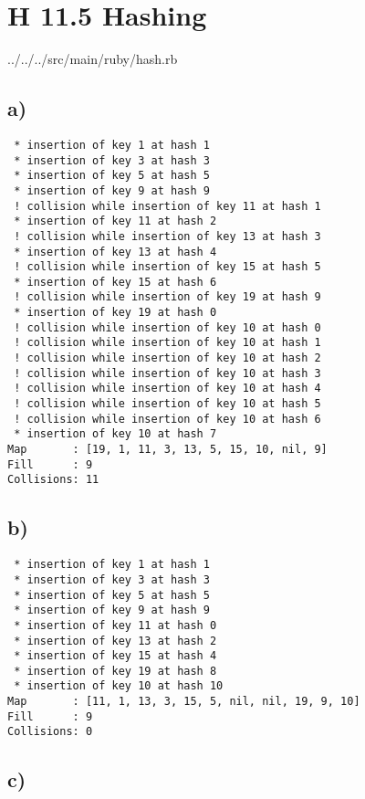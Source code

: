 \documentclass[a4paper]{article}
\begin{document}
\section*{H 11.5 Hashing}


{../../../src/main/ruby/hash.rb}

\subsection*{a)}

\begin{verbatim}
 * insertion of key 1 at hash 1
 * insertion of key 3 at hash 3
 * insertion of key 5 at hash 5
 * insertion of key 9 at hash 9
 ! collision while insertion of key 11 at hash 1
 * insertion of key 11 at hash 2
 ! collision while insertion of key 13 at hash 3
 * insertion of key 13 at hash 4
 ! collision while insertion of key 15 at hash 5
 * insertion of key 15 at hash 6
 ! collision while insertion of key 19 at hash 9
 * insertion of key 19 at hash 0
 ! collision while insertion of key 10 at hash 0
 ! collision while insertion of key 10 at hash 1
 ! collision while insertion of key 10 at hash 2
 ! collision while insertion of key 10 at hash 3
 ! collision while insertion of key 10 at hash 4
 ! collision while insertion of key 10 at hash 5
 ! collision while insertion of key 10 at hash 6
 * insertion of key 10 at hash 7
Map       : [19, 1, 11, 3, 13, 5, 15, 10, nil, 9]
Fill      : 9
Collisions: 11
\end{verbatim}

\subsection*{b)}

\begin{verbatim}
 * insertion of key 1 at hash 1
 * insertion of key 3 at hash 3
 * insertion of key 5 at hash 5
 * insertion of key 9 at hash 9
 * insertion of key 11 at hash 0
 * insertion of key 13 at hash 2
 * insertion of key 15 at hash 4
 * insertion of key 19 at hash 8
 * insertion of key 10 at hash 10
Map       : [11, 1, 13, 3, 15, 5, nil, nil, 19, 9, 10]
Fill      : 9
Collisions: 0
\end{verbatim}

\subsection*{c)}
\end{document}
